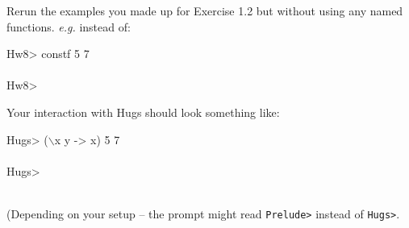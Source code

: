 \documentclass[11pt]{article}
\begin{document}
\begin{exercise}
Rerun the examples you made up for Exercise 1.2 but without using any named functions.
{\em{e.g.}} instead of:
\begin{program*}
\> Hw8> constf 5 7 \\
 \\
\> Hw8>  \\
\end{program*}
Your interaction with Hugs   should look something like:
\begin{program*}
\> Hugs> ($\backslash$x y -> x) 5 7 \\
 \\
\> Hugs>  \\
\end{program*}

\ \\(Depending on your setup -- the prompt might read {\tt{Prelude>}} instead of {\tt{Hugs>}}.



\end{exercise}
\end{document}
